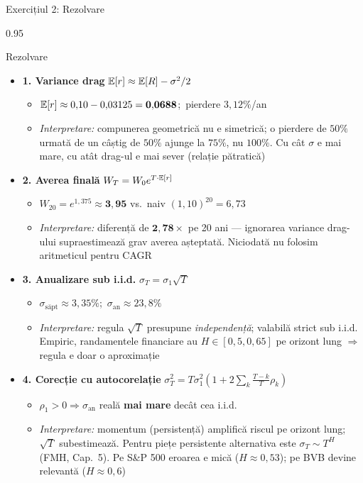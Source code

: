 \documentclass[9pt, aspectratio=169, t]{beamer}
\begin{document}
\begin{frame}[shrink=25]{Exercițiul 2: Rezolvare}
\begin{cminipage}{0.95\textwidth}
\begin{exampleblock}{Rezolvare}
\begin{itemize}\setlength{\itemsep}{0pt}
    \item \textbf{1. Variance drag} \quad $\mathbb{E}[r] \approx \mathbb{E}[R] - \sigma^2/2$
    \begin{itemize}\setlength{\itemsep}{0pt}
        \item $\mathbb{E}[r] \approx 0{,}10 - 0{,}03125 = \mathbf{0{,}0688}$;\ pierdere $3{,}12\%$/an
        \item \textit{Interpretare:} compunerea geometrică nu e simetrică; o pierdere de $50\%$ urmată de un câștig de $50\%$ ajunge la $75\%$, nu $100\%$. Cu cât $\sigma$ e mai mare, cu atât drag-ul e mai sever (relație pătratică)
    \end{itemize}
    \item \textbf{2. Averea finală} \quad $W_T = W_0 e^{T \cdot \mathbb{E}[r]}$
    \begin{itemize}\setlength{\itemsep}{0pt}
        \item $W_{20} = e^{1{,}375} \approx \mathbf{3{,}95}$ vs.\ naiv $(1{,}10)^{20} = 6{,}73$
        \item \textit{Interpretare:} diferență de $\mathbf{2{,}78\times}$ pe 20 ani --- ignorarea variance drag-ului supraestimează grav averea așteptată. Niciodată nu folosim aritmeticul pentru CAGR
    \end{itemize}
    \item \textbf{3. Anualizare sub i.i.d.} \quad $\sigma_T = \sigma_1 \sqrt{T}$
    \begin{itemize}\setlength{\itemsep}{0pt}
        \item $\sigma_{\text{săpt}} \approx 3{,}35\%$;\ $\sigma_{\text{an}} \approx 23{,}8\%$
        \item \textit{Interpretare:} regula $\sqrt T$ presupune \emph{independență}; valabilă strict sub i.i.d. Empiric, randamentele financiare au $H \in [0{,}5, 0{,}65]$ pe orizont lung $\Rightarrow$ regula e doar o aproximație
    \end{itemize}
    \item \textbf{4. Corecție cu autocorelație} \quad $\sigma^2_T = T\sigma^2_1\left(1 + 2\sum_{k}\frac{T-k}{T}\rho_k\right)$
    \begin{itemize}\setlength{\itemsep}{0pt}
        \item $\rho_1 > 0 \Rightarrow \sigma_{\text{an}}$ reală \textbf{mai mare} decât cea i.i.d.
        \item \textit{Interpretare:} momentum (persistență) amplifică riscul pe orizont lung; $\sqrt T$ subestimează. Pentru piețe persistente alternativa este $\sigma_T \sim T^H$ (FMH, Cap.~5). Pe S\&P 500 eroarea e mică ($H \approx 0{,}53$); pe BVB devine relevantă ($H \approx 0{,}6$)
    \end{itemize}
\end{itemize}
\end{exampleblock}


\end{cminipage}
\end{frame}
\end{document}
